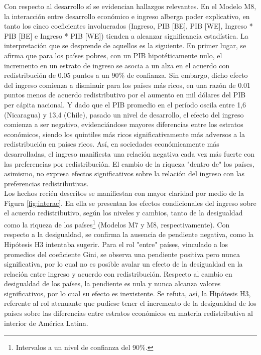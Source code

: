 \documentclass[12pt,letterpaper]{article}
\begin{document}
Con respecto al desarrollo sí se evidencian hallazgos relevantes. En el Modelo M8, la interacción entre desarrollo económico e ingreso alberga poder explicativo, en tanto los cinco coeficientes involucrados (Ingreso, PIB [BE], PIB [WE], Ingreso * PIB [BE] e Ingreso * PIB [WE]) tienden a alcanzar significancia estadística. La interpretación que se desprende de aquellos es la siguiente. En primer lugar, se afirma que para los países pobres, con un PIB hipotéticamente nulo, el incremento en un estrato de ingreso se asocia a un alza en el acuerdo con redistribución de 0.05 puntos a un 90\% de confianza. Sin embargo, dicho efecto del ingreso comienza a disminuir para los países más ricos, en una razón de 0.01 puntos menos de acuerdo redistributivo por el aumento en mil dólares del PIB per cápita nacional. Y dado que el PIB promedio en el período oscila entre 1,6 (Nicaragua) y 13,4 (Chile), pasado un nivel de desarrollo, el efecto del ingreso comienza a ser negativo, evidenciándose mayores diferencias entre los estratos económicos, siendo los quintiles más ricos significativamente más adversos a la redistribución en países ricos. Así, en sociedades económicamente más desarrolladas, el ingreso manifiesta una relación negativa cada vez más fuerte con las preferencias por redistribución. El cambio de la riqueza "dentro de" los países, asimismo, no expresa efectos significativos sobre la relación del ingreso con las preferencias redistributivas.\\

Los hechos recién descritos se manifiestan con mayor claridad por medio de la Figura \ref{fig:interac}. En ella se presentan los efectos condicionales del ingreso sobre el acuerdo redistributivo, según los niveles y cambios, tanto de la desigualdad como la riqueza de los países\footnote{Intervalos a un nivel de confianza del 90\%.} (Modelos M7 y M8, respectivamente). Con respecto a la desigualdad, se confirma la ausencia de pendiente negativa, como la Hipótesis H3 intentaba sugerir. Para el rol "entre" países, vinculado a los promedios del coeficiente Gini, se observa una pendiente positiva pero nunca significativa, por lo cual no es posible avalar un efecto de la desigualdad en la relación entre ingreso y acuerdo con redistribución. Respecto al cambio en desigualdad de los países, la pendiente es nula y nunca alcanza valores significativos, por lo cual su efecto es inexistente. Se refuta, así, la Hipótesis H3, referente al rol atenuante que pudiese tener el incremento de la desigualdad de los países sobre las diferencias entre estratos económicos en materia redistributiva al interior de América Latina.\\
\end{document}
